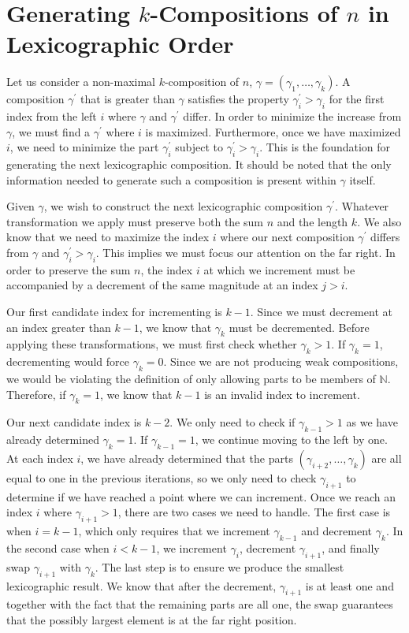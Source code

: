 \section{Generating $k$-Compositions of $n$ in Lexicographic Order}
\label{sec:generating_k_compositions}

Let us consider a non-maximal $k$-composition of $n$, $\gamma = (\gamma_1, \dots, \gamma_k)$. A composition $\gamma^{\prime}$ that is greater than $\gamma$ satisfies the property $\gamma^{\prime}_i > \gamma_i$ for the first index from the left $i$ where $\gamma$ and $\gamma^{\prime}$ differ. In order to minimize the increase from $\gamma$, we must find a $\gamma^{\prime}$ where $i$ is maximized. Furthermore, once we have maximized $i$, we need to minimize the part $\gamma^{\prime}_i$ subject to $\gamma^{\prime}_i > \gamma_i$. This is the foundation for generating the next lexicographic composition. It should be noted that the only information needed to generate such a composition is present within $\gamma$ itself.

Given $\gamma$, we wish to construct the next lexicographic composition $\gamma^{\prime}$. Whatever transformation we apply must preserve both the sum $n$ and the length $k$. We also know that we need to maximize the index $i$ where our next composition $\gamma^{\prime}$ differs from $\gamma$ and $\gamma^{\prime}_i > \gamma_i$. This implies we must focus our attention on the far right. In order to preserve the sum $n$, the index $i$ at which we increment must be accompanied by a decrement of the same magnitude at an index $j > i$.

Our first candidate index for incrementing is $k - 1$. Since we must decrement at an index greater than $k - 1$, we know that $\gamma_k$ must be decremented. Before applying these transformations, we must first check whether $\gamma_k > 1$. If $\gamma_k = 1$, decrementing would force $\gamma_k = 0$. Since we are not producing weak compositions, we would be violating the definition of only allowing parts to be members of $\mathbb{N}$. Therefore, if $\gamma_k = 1$, we know that $k - 1$ is an invalid index to increment.

Our next candidate index is $k - 2$. We only need to check if $\gamma_{k - 1} > 1$ as we have already determined $\gamma_{k} = 1$. If $\gamma_{k - 1} = 1$, we continue moving to the left by one. At each index $i$, we have already determined that the parts $(\gamma_{i + 2}, \dots, \gamma_k)$ are all equal to one in the previous iterations, so we only need to check $\gamma_{i + 1}$ to determine if we have reached a point where we can increment. Once we reach an index $i$ where $\gamma_{i + 1} > 1$, there are two cases we need to handle. The first case is when $i = k - 1$, which only requires that we increment $\gamma_{k - 1}$ and decrement $\gamma_k$. In the second case when $i < k - 1$, we increment $\gamma_i$, decrement $\gamma_{i + 1}$, and finally swap $\gamma_{i + 1}$ with $\gamma_k$. The last step is to ensure we produce the smallest lexicographic result. We know that after the decrement, $\gamma_{i + 1}$ is at least one and together with the fact that the remaining parts are all one, the swap guarantees that the possibly largest element is at the far right position.

